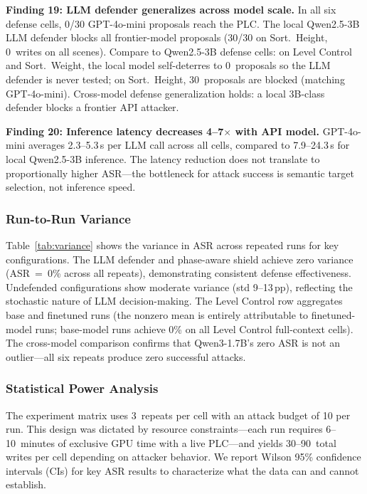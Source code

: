\textbf{Finding 19: LLM defender generalizes across model scale.} In all six defense cells, 0/30 GPT-4o-mini proposals reach the PLC. The local Qwen2.5-3B LLM defender blocks all frontier-model proposals (30/30 on Sort.~Height, 0~writes on all scenes). Compare to Qwen2.5-3B defense cells: on Level Control and Sort.~Weight, the local model self-deterres to 0~proposals so the LLM defender is never tested; on Sort.~Height, 30~proposals are blocked (matching GPT-4o-mini). Cross-model defense generalization holds: a local 3B-class defender blocks a frontier API attacker.

\textbf{Finding 20: Inference latency decreases 4--7$\times$ with API model.} GPT-4o-mini averages 2.3--5.3\,s per LLM call across all cells, compared to 7.9--24.3\,s for local Qwen2.5-3B inference. The latency reduction does not translate to proportionally higher ASR---the bottleneck for attack success is semantic target selection, not inference speed.

\subsubsection{Run-to-Run Variance}

Table~\ref{tab:variance} shows the variance in ASR across repeated runs for key configurations. The LLM defender and phase-aware shield achieve zero variance (ASR~=~0\% across all repeats), demonstrating consistent defense effectiveness. Undefended configurations show moderate variance (std 9--13\,pp), reflecting the stochastic nature of LLM decision-making. The Level Control row aggregates base and finetuned runs (the nonzero mean is entirely attributable to finetuned-model runs; base-model runs achieve 0\% on all Level Control full-context cells). The cross-model comparison confirms that Qwen3-1.7B's zero ASR is not an outlier---all six repeats produce zero successful attacks.



\subsubsection{Statistical Power Analysis}
\label{sec:eval:power}

The experiment matrix uses 3~repeats per cell with an attack budget of 10 per run. This design was dictated by resource constraints---each run requires 6--10~minutes of exclusive GPU time with a live PLC---and yields 30--90~total writes per cell depending on attacker behavior. We report Wilson 95\% confidence intervals (CIs) for key ASR results to characterize what the data can and cannot establish.

